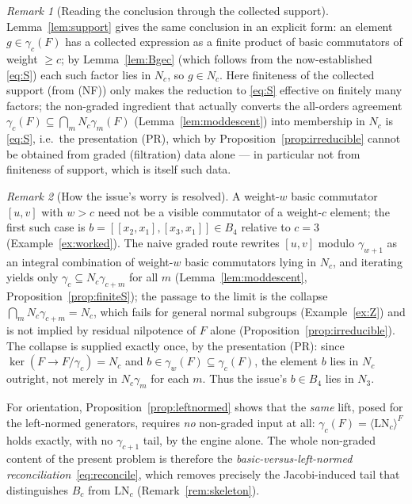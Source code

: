 \documentclass{amsart}
\theoremstyle{definition}
\theoremstyle{remark}
\newtheorem{remark}{Remark}
\begin{document}
\begin{remark}[Reading the conclusion through the collected support]\label{rem:support-read}
Lemma~\ref{lem:support} gives the same conclusion in an explicit form: an element
$g\in\gamma_c(F)$ has a collected expression as a finite product of basic commutators of weight
$\ge c$; by Lemma~\ref{lem:Bgec} (which follows from the now-established \eqref{eq:S}) each such
factor lies in $N_c$, so $g\in N_c$. Here finiteness of the collected support (from (NF)) only
makes the reduction to \eqref{eq:S} effective on finitely many factors; the non-graded ingredient
that actually converts the all-orders agreement
$\gamma_c(F)\subseteq\bigcap_m N_c\gamma_m(F)$ (Lemma~\ref{lem:moddescent}) into membership in
$N_c$ is \eqref{eq:S}, i.e.\ the presentation (PR), which by
Proposition~\ref{prop:irreducible} cannot be obtained from graded (filtration) data alone --- in
particular not from finiteness of support, which is itself such data.
\end{remark}

\begin{remark}[How the issue's worry is resolved]\label{rem:issue}
A weight-$w$ basic commutator $[u,v]$ with $w>c$ need not be a visible commutator of a
weight-$c$ element; the first such case is $b=[[x_2,x_1],[x_3,x_1]]\in B_4$ relative to
$c=3$ (Example~\ref{ex:worked}). The naive graded route rewrites $[u,v]$ modulo
$\gamma_{w+1}$ as an integral combination of weight-$w$ basic commutators lying in $N_c$, and
iterating yields only $\gamma_c\subseteq N_c\gamma_{c+m}$ for all $m$
(Lemma~\ref{lem:moddescent}, Proposition~\ref{prop:finiteS}); the passage to the limit is the
collapse $\bigcap_m N_c\gamma_{c+m}=N_c$, which fails for general normal subgroups
(Example~\ref{ex:Z}) and is not implied by residual nilpotence of $F$ alone
(Proposition~\ref{prop:irreducible}). The collapse is supplied exactly once, by the
presentation (PR): since $\ker(F\to F/\gamma_c)=N_c$ and $b\in\gamma_w(F)\subseteq\gamma_c(F)$,
the element $b$ lies in $N_c$ outright, not merely in $N_c\gamma_m$ for each $m$. Thus the
issue's $b\in B_4$ lies in $N_3$.

For orientation, Proposition~\ref{prop:leftnormed} shows that the \emph{same} lift, posed for
the left-normed generators, requires \emph{no} non-graded input at all:
$\gamma_c(F)=\langle\mathrm{LN}_c\rangle^{F}$ holds exactly, with no $\gamma_{c+1}$ tail, by the
engine alone. The whole non-graded content of the present problem is therefore the
\emph{basic-versus-left-normed reconciliation}~\eqref{eq:reconcile}, which removes precisely the
Jacobi-induced tail that distinguishes $B_c$ from $\mathrm{LN}_c$
(Remark~\ref{rem:skeleton}).
\end{remark}
\end{document}
